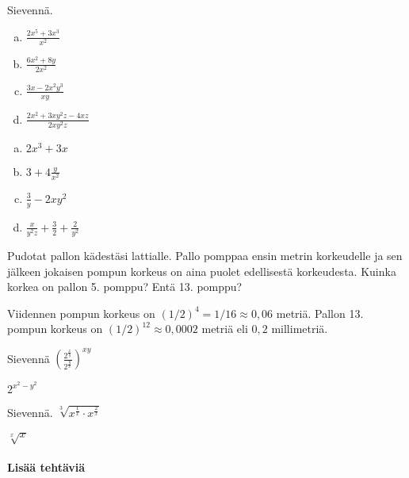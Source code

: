 \begin{tehtavasivu}
\begin{tehtava}
Sievennä.
	\begin{enumerate}[a)]
	\item $\frac{2x^5+3x^3}{x^2}$
	\item $\frac{6x^2+8y}{2x^2}$
	\item $\frac{3x-2x^2y^3}{xy}$
	\item $\frac{2x^2+3xy^2z-4xz}{2xy^2z}$
	\end{enumerate}

\begin{vastaus}
	\begin{enumerate}[a)]
	\item $2x^3+3x$
	\item $3+4 \frac{y}{x^2}$
	\item $\frac{3}{y} - 2xy^2$
	\item $\frac{x}{y^2z} + \frac{3}{2} + \frac{2}{y^2}$
	\end{enumerate}
\end{vastaus}
\end{tehtava}

\begin{tehtava}
        Pudotat pallon kädestäsi lattialle. Pallo pomppaa ensin metrin korkeudelle ja sen jälkeen jokaisen pompun korkeus on aina puolet edellisestä korkeudesta. Kuinka korkea on pallon 5. pomppu? Entä 13. pomppu?     
        \begin{vastaus}
        Viidennen pompun korkeus on $(1/2)^4=1/16 \approx 0,06$ metriä. Pallon 13. pompun korkeus on $(1/2)^{12} \approx 0,0002$ metriä eli $0,2$ millimetriä.
        \end{vastaus}
\end{tehtava}

\begin{tehtava}
Sievennä
$( \frac{2^{\frac{x}{y}}}{2^{\frac{y}{x}}} )^{xy}$
\begin{vastaus}
 $2^{x^2 - y^2}$
\end{vastaus}


\end{tehtava}

\begin{tehtava}
Sievennä.
$\sqrt[3]{ x^{\frac{1}{x}} \cdot x^{\frac{2}{x}} }$
 \begin{vastaus}
  $\sqrt[x]{x}$
 \end{vastaus}
\end{tehtava}
 
\paragraph*{Lisää tehtäviä}


\end{tehtavasivu}

